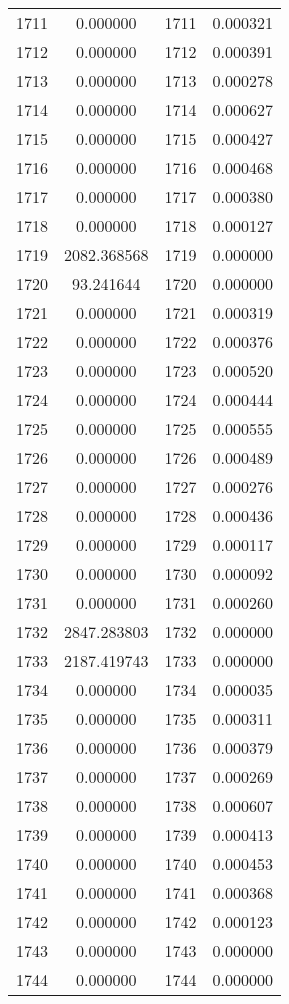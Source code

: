 \documentclass[12pt]{article}
\begin{document}
\begin{longtable}{@{}cccc@{}}
1711 & 0.000000 & 1711 & 0.000321 \\
1712 & 0.000000 & 1712 & 0.000391 \\
1713 & 0.000000 & 1713 & 0.000278 \\
1714 & 0.000000 & 1714 & 0.000627 \\
1715 & 0.000000 & 1715 & 0.000427 \\
1716 & 0.000000 & 1716 & 0.000468 \\
1717 & 0.000000 & 1717 & 0.000380 \\
1718 & 0.000000 & 1718 & 0.000127 \\
1719 & 2082.368568 & 1719 & 0.000000 \\
1720 & 93.241644 & 1720 & 0.000000 \\
1721 & 0.000000 & 1721 & 0.000319 \\
1722 & 0.000000 & 1722 & 0.000376 \\
1723 & 0.000000 & 1723 & 0.000520 \\
1724 & 0.000000 & 1724 & 0.000444 \\
1725 & 0.000000 & 1725 & 0.000555 \\
1726 & 0.000000 & 1726 & 0.000489 \\
1727 & 0.000000 & 1727 & 0.000276 \\
1728 & 0.000000 & 1728 & 0.000436 \\
1729 & 0.000000 & 1729 & 0.000117 \\
1730 & 0.000000 & 1730 & 0.000092 \\
1731 & 0.000000 & 1731 & 0.000260 \\
1732 & 2847.283803 & 1732 & 0.000000 \\
1733 & 2187.419743 & 1733 & 0.000000 \\
1734 & 0.000000 & 1734 & 0.000035 \\
1735 & 0.000000 & 1735 & 0.000311 \\
1736 & 0.000000 & 1736 & 0.000379 \\
1737 & 0.000000 & 1737 & 0.000269 \\
1738 & 0.000000 & 1738 & 0.000607 \\
1739 & 0.000000 & 1739 & 0.000413 \\
1740 & 0.000000 & 1740 & 0.000453 \\
1741 & 0.000000 & 1741 & 0.000368 \\
1742 & 0.000000 & 1742 & 0.000123 \\
1743 & 0.000000 & 1743 & 0.000000 \\
1744 & 0.000000 & 1744 & 0.000000 \\

\end{longtable}
\end{document}
